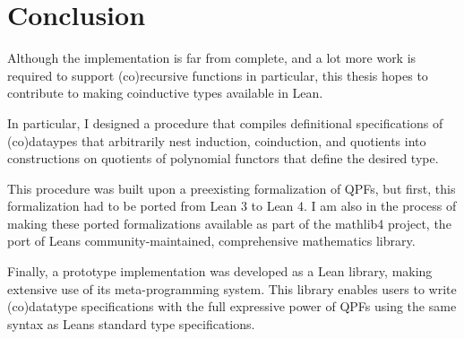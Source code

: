 
\chapter{Conclusion}
\label{ch:conclusion}

Although the implementation is far from complete, and a lot more work is required to support (co)recursive
functions in particular, this thesis hopes to contribute to making coinductive types available in Lean. 

In particular, I designed a procedure that compiles definitional specifications of (co)dataypes
that arbitrarily nest induction, coinduction, and quotients into constructions on quotients of polynomial functors that define the desired type.

This procedure was built upon a preexisting formalization of QPFs, but first,
this formalization had to be ported from Lean 3 to Lean 4. I am also in the process of making
these ported formalizations available as part of the mathlib4 project, the port of Leans community-maintained, comprehensive mathematics library.

Finally, a prototype implementation was developed as a Lean library, making extensive use of its meta-programming system.
This library enables users to write (co)datatype specifications with the full expressive power of QPFs using the
same syntax as Leans standard \inductive{} type specifications.